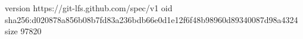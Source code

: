 version https://git-lfs.github.com/spec/v1
oid sha256:d020878a856b08b7fd83a236bdb66e0d1e12f6f48b98960d89340087d98a4324
size 97820
